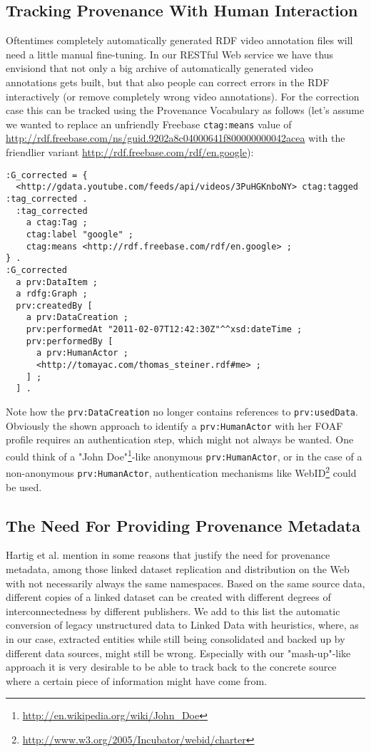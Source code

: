 \documentclass{acm_proc_article-sp}
\begin{document}
\subsection{Tracking Provenance With Human Interaction}\label{sec:human}
Oftentimes completely automatically generated RDF video annotation files will need a little manual fine-tuning. In our RESTful Web service we have thus envisiond that not only a big archive of automatically generated video annotations gets built, but that also people can correct errors in the RDF interactively (or remove completely wrong video annotations). For the correction case this can be tracked using the Provenance Vocabulary as follows (let's assume we wanted to replace an unfriendly Freebase \texttt{ctag:means} value of \url{http://rdf.freebase.com/ns/guid.9202a8c04000641f800000000042acea} with the friendlier variant \url{http://rdf.freebase.com/rdf/en.google}):
\begin{verbatim}
:G_corrected = {
  <http://gdata.youtube.com/feeds/api/videos/3PuHGKnboNY> ctag:tagged :tag_corrected .
  :tag_corrected
    a ctag:Tag ;
    ctag:label "google" ;
    ctag:means <http://rdf.freebase.com/rdf/en.google> ;
} .
:G_corrected
  a prv:DataItem ;
  a rdfg:Graph ;
  prv:createdBy [
    a prv:DataCreation ;
    prv:performedAt "2011-02-07T12:42:30Z"^^xsd:dateTime ;
    prv:performedBy [
      a prv:HumanActor ;
      <http://tomayac.com/thomas_steiner.rdf#me> ;
    ] ;
  ] .
\end{verbatim}
Note how the \texttt{prv:DataCreation} no longer contains references to \texttt{prv:usedData}. Obviously the shown approach to identify a \texttt{prv:HumanActor} with her FOAF profile requires an authentication step, which might not always be wanted. One could think of a "John Doe"\footnote{\url{http://en.wikipedia.org/wiki/John_Doe}}-like anonymous \texttt{prv:HumanActor}, or in the case of a non-anonymous \texttt{prv:HumanActor}, authentication mechanisms like WebID\footnote{\url{http://www.w3.org/2005/Incubator/webid/charter}} could be used.

\subsection{The Need For Providing Provenance Metadata}
Hartig et al. mention in \cite{ipaw10:olaf} some reasons that justify the need for provenance metadata, among those linked dataset replication and distribution on the Web with not necessarily always the same namespaces. Based on the same source data, different copies of a linked dataset can be created with different degrees of interconnectedness by different publishers. We add to this list the automatic conversion of legacy unstructured data to Linked Data with heuristics, where, as in our case, extracted entities while still being consolidated and backed up by different data sources, might still be wrong. Especially with our "mash-up"-like approach it is very desirable to be able to track back to the concrete source where a certain piece of information might have come from. 
\end{document}
